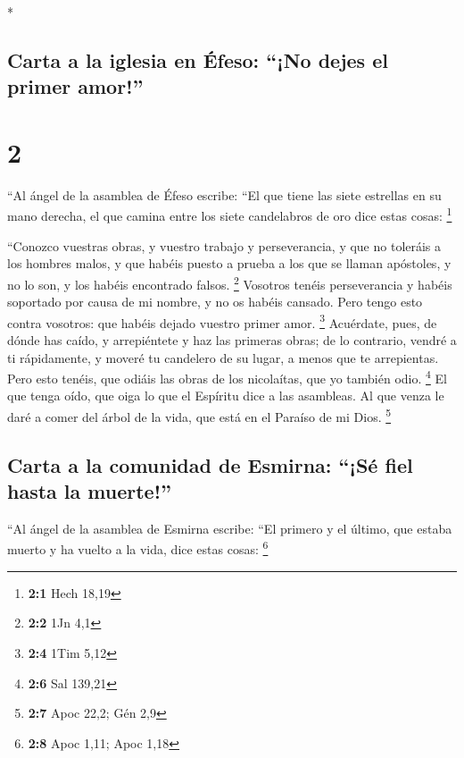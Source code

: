 \begin{paracol}{2}
\begin{otherlanguage}{english}
\end{otherlanguage}

\switchcolumn[0]*

\hypertarget{carta-a-la-iglesia-en-uxe9feso-no-dejes-el-primer-amor}{%
\subsection{Carta a la iglesia en Éfeso: ``¡No dejes el primer
amor!''}\label{carta-a-la-iglesia-en-uxe9feso-no-dejes-el-primer-amor}}

\hypertarget{section-2}{%
\section{2}\label{section-2}}

 ``Al ángel de la asamblea de Éfeso escribe: ``El que
tiene las siete estrellas en su mano derecha, el que camina entre los
siete candelabros de oro dice estas cosas: \footnote{\textbf{2:1} Hech
  18,19}

 ``Conozco vuestras obras, y vuestro trabajo y
perseverancia, y que no toleráis a los hombres malos, y que habéis
puesto a prueba a los que se llaman apóstoles, y no lo son, y los habéis
encontrado falsos. \footnote{\textbf{2:2} 1Jn 4,1} 
Vosotros tenéis perseverancia y habéis soportado por causa de mi nombre,
y no os habéis cansado.  Pero tengo esto contra vosotros:
que habéis dejado vuestro primer amor. \footnote{\textbf{2:4} 1Tim 5,12}
 Acuérdate, pues, de dónde has caído, y arrepiéntete y haz
las primeras obras; de lo contrario, vendré a ti rápidamente, y moveré
tu candelero de su lugar, a menos que te arrepientas. 
Pero esto tenéis, que odiáis las obras de los nicolaítas, que yo también
odio. \footnote{\textbf{2:6} Sal 139,21}  El que tenga
oído, que oiga lo que el Espíritu dice a las asambleas. Al que venza le
daré a comer del árbol de la vida, que está en el Paraíso de mi Dios.
\footnote{\textbf{2:7} Apoc 22,2; Gén 2,9}

\hypertarget{carta-a-la-comunidad-de-esmirna-suxe9-fiel-hasta-la-muerte}{%
\subsection{Carta a la comunidad de Esmirna: ``¡Sé fiel hasta la
muerte!''}\label{carta-a-la-comunidad-de-esmirna-suxe9-fiel-hasta-la-muerte}}

 ``Al ángel de la asamblea de Esmirna escribe: ``El
primero y el último, que estaba muerto y ha vuelto a la vida, dice estas
cosas: \footnote{\textbf{2:8} Apoc 1,11; Apoc 1,18}


\end{paracol}
